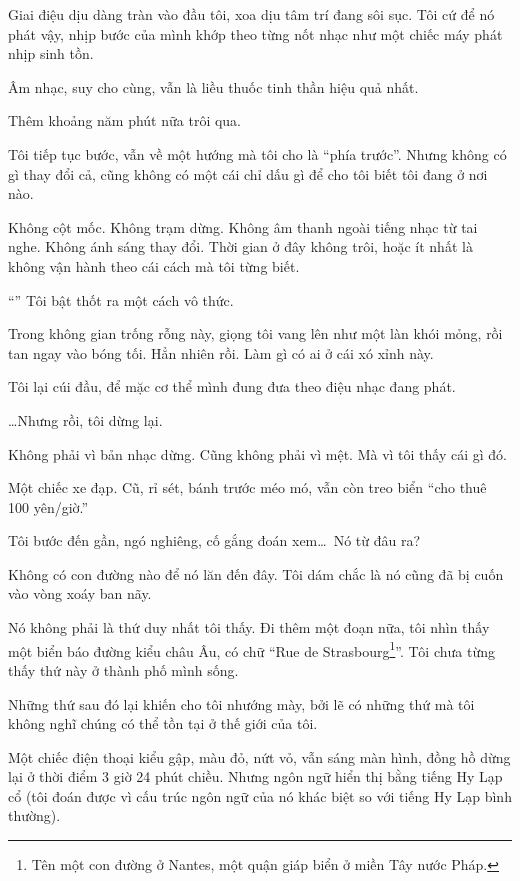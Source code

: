 \documentclass[../main.tex]{subfiles}
\begin{document}
Giai điệu dịu dàng tràn vào đầu tôi, xoa dịu tâm trí đang sôi sục. Tôi cứ để nó phát vậy, nhịp bước của mình khớp theo từng nốt nhạc như một chiếc máy phát nhịp sinh tồn.

Âm nhạc, suy cho cùng, vẫn là liều thuốc tinh thần hiệu quả nhất.

\ct

Thêm khoảng năm phút nữa trôi qua.

Tôi tiếp tục bước, vẫn về một hướng mà tôi cho là ``phía trước''. Nhưng không có gì thay đổi cả, cũng không có một cái chỉ dấu gì để cho tôi biết tôi đang ở nơi nào.

Không cột mốc. Không trạm dừng. Không âm thanh ngoài tiếng nhạc từ tai nghe. Không ánh sáng thay đổi. Thời gian ở đây không trôi, hoặc ít nhất là không vận hành theo cái cách mà tôi từng biết.

``'' Tôi bật thốt ra một cách vô thức.

Trong không gian trống rỗng này, giọng tôi vang lên như một làn khói mỏng, rồi tan ngay vào bóng tối. Hẳn nhiên rồi. Làm gì có ai ở cái xó xỉnh này.

Tôi lại cúi đầu, để mặc cơ thể mình đung đưa theo điệu nhạc đang phát.

\dots Nhưng rồi, tôi dừng lại.

Không phải vì bản nhạc dừng. Cũng không phải vì mệt. Mà vì tôi thấy cái gì đó.

Một chiếc xe đạp. Cũ, rỉ sét, bánh trước méo mó, vẫn còn treo biển ``cho thuê 100 yên/giờ.''

Tôi bước đến gần, ngó nghiêng, cố gắng đoán xem\dots\ Nó từ đâu ra?

Không có con đường nào để nó lăn đến đây. Tôi dám chắc là nó cũng đã bị cuốn vào vòng xoáy ban nãy.

Nó không phải là thứ duy nhất tôi thấy. Đi thêm một đoạn nữa, tôi nhìn thấy một biển báo đường kiểu châu Âu, có chữ ``Rue de Strasbourg\footnote{Tên một con đường ở Nantes, một quận giáp biển ở miền Tây nước Pháp.}''. Tôi chưa từng thấy thứ này ở thành phố mình sống.

Những thứ sau đó lại khiến cho tôi nhướng mày, bởi lẽ có những thứ mà tôi không nghĩ chúng có thể tồn tại ở thế giới của tôi.

Một chiếc điện thoại kiểu gập, màu đỏ, nứt vỏ, vẫn sáng màn hình, đồng hồ dừng lại ở thời điểm 3 giờ 24 phút chiều. Nhưng ngôn ngữ hiển thị bằng tiếng Hy Lạp cổ (tôi đoán được vì cấu trúc ngôn ngữ của nó khác biệt so với tiếng Hy Lạp bình thường).
\end{document}
